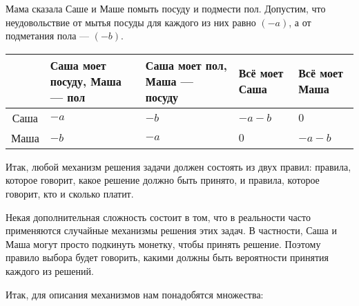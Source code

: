 \begin{myex} \label{sm_posuda} Мама сказала Саше и Маше помыть посуду и подмести пол. До\-пус\-тим, что неудовольствие от мытья посуды для каждого из них равно $ (-a) $, а от подметания пола — $ (-b) $.

\begin{tabular}{c|p{2.2 cm}p{2.2 cm}p{2.2 cm}p{2.2 cm}}
& Саша моет посуду, Маша — пол & Саша моет пол, Маша — посуду & Всё моет Саша & Всё моет Маша \\
\hline
Саша & $ -a $ & $ -b $ & $ -a-b $ & $ 0 $ \\
Маша & $ -b $ & $ -a $ & $ 0 $ & $ -a-b $ \\
\end{tabular}

\end{myex}


Итак, любой механизм решения задачи должен состоять из двух правил: правила, которое говорит, какое решение должно быть принято, и правила, которое говорит, кто и сколько платит.

Некая дополнительная сложность состоит в том, что в реальности часто применяются случайные механизмы решения этих задач. В частности, Саша и Маша могут просто подкинуть монетку, чтобы принять решение. Поэтому правило выбора будет говорить, какими должны быть вероятности принятия каждого из решений.

Итак, для описания механизмов нам понадобятся множества:

